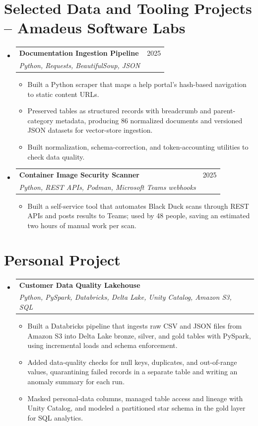 \documentclass[a4paper,11pt]{article}
\makeatletter
\newcommand{\entry}[4]{\item\begin{tabularx}{\textwidth}{@{}Xr@{}}\textbf{#1}& #2\\\textit{\small #3}&\textit{\small #4}\end{tabularx}\vspace{-5pt}}
\newcommand{\bulletpoint}[1]{\item\small{#1}}
\makeatother
\begin{document}
\section{Selected Data and Tooling Projects -- Amadeus Software Labs}
\begin{itemize}[leftmargin=0in,label={}]
  \entry{Documentation Ingestion Pipeline}{2025}{Python, Requests, BeautifulSoup, JSON}{}
  \begin{itemize}
    \bulletpoint{Built a Python scraper that maps a help portal's hash-based navigation to static content URLs.}
    \bulletpoint{Preserved tables as structured records with breadcrumb and parent-category metadata, producing 86 normalized documents and versioned JSON datasets for vector-store ingestion.}
    \bulletpoint{Built normalization, schema-correction, and token-accounting utilities to check data quality.}
  \end{itemize}
  \entry{Container Image Security Scanner}{2025}{Python, REST APIs, Podman, Microsoft Teams webhooks}{}
  \begin{itemize}
    \bulletpoint{Built a self-service tool that automates Black Duck scans through REST APIs and posts results to Teams; used by 48 people, saving an estimated two hours of manual work per scan.}
  \end{itemize}
\end{itemize}

\section{Personal Project}
\begin{itemize}[leftmargin=0in,label={}]
  \entry{Customer Data Quality Lakehouse}{}{Python, PySpark, Databricks, Delta Lake, Unity Catalog, Amazon S3, SQL}{}
  \begin{itemize}
    \bulletpoint{Built a Databricks pipeline that ingests raw CSV and JSON f{}iles from Amazon S3 into Delta Lake bronze, silver, and gold tables with PySpark, using incremental loads and schema enforcement.}
    \bulletpoint{Added data-quality checks for null keys, duplicates, and out-of-range values, quarantining failed records in a separate table and writing an anomaly summary for each run.}
    \bulletpoint{Masked personal-data columns, managed table access and lineage with Unity Catalog, and modeled a partitioned star schema in the gold layer for SQL analytics.}
  \end{itemize}
\end{itemize}
\end{document}
